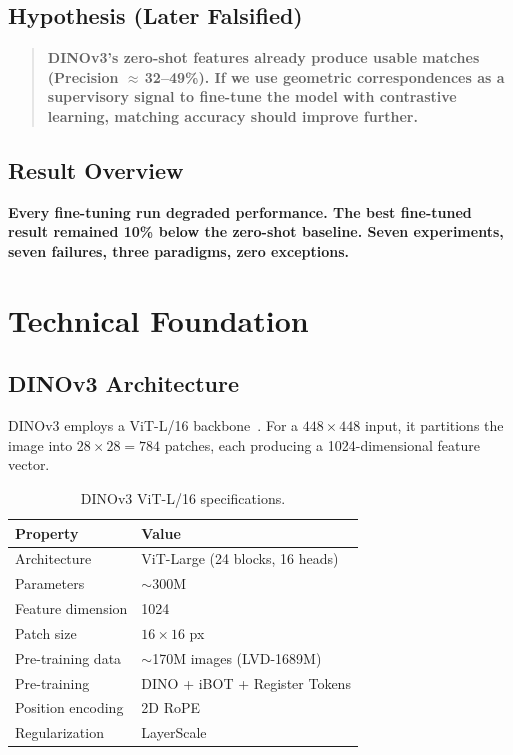 \documentclass[11pt,a4paper]{article}
\begin{document}
\subsection{Hypothesis (Later Falsified)}

\begin{quote}
\bfseries DINOv3's zero-shot features already produce usable matches (Precision $\approx$\,32--49\%). If we use geometric correspondences as a supervisory signal to fine-tune the model with contrastive learning, matching accuracy should improve further.
\end{quote}

\subsection{Result Overview}

\begin{center}
\color{red!75!black}\bfseries
Every fine-tuning run degraded performance. The best fine-tuned result remained 10\% below the zero-shot baseline. Seven experiments, seven failures, three paradigms, zero exceptions.
\end{center}

\section{Technical Foundation}

\subsection{DINOv3 Architecture}

DINOv3 employs a ViT-L/16 backbone~\cite{vit}. For a $448\times448$ input, it partitions the image into $28\times28 = 784$ patches, each producing a 1024-dimensional feature vector.

\begin{table}[t]
\centering\small
\caption{DINOv3 ViT-L/16 specifications.}
\label{tab:dinov3_params}
\begin{tabular}{@{}ll@{}}
\toprule
\textbf{Property} & \textbf{Value} \\
\midrule
Architecture      & ViT-Large (24 blocks, 16 heads) \\
Parameters        & $\sim$300M \\
Feature dimension & 1024 \\
Patch size        & $16\!\times\!16$ px \\
Pre-training data & $\sim$170M images (LVD-1689M) \\
Pre-training      & DINO + iBOT + Register Tokens \\
Position encoding & 2D RoPE \\
Regularization    & LayerScale \\
\bottomrule
\end{tabular}
\end{table}
\end{document}
